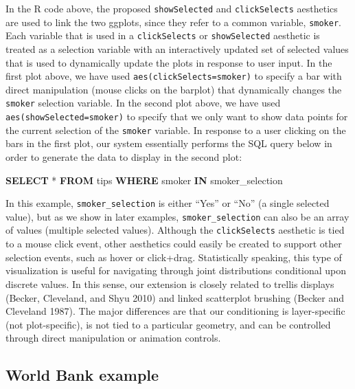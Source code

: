 \documentclass[12pt,]{article}
\newenvironment{Shaded}{\begin{snugshade}}{\end{snugshade}}
\newcommand{\KeywordTok}[1]{\textcolor[rgb]{0.13,0.29,0.53}{\textbf{#1}}}
\newcommand{\NormalTok}[1]{#1}
\theoremstyle{definition}
\theoremstyle{definition}
\theoremstyle{definition}
\theoremstyle{remark}
\begin{document}
In the R code above, the proposed \texttt{showSelected} and
\texttt{clickSelects} aesthetics are used to link the two ggplots, since
they refer to a common variable, \texttt{smoker}. Each variable that is
used in a \texttt{clickSelects} or \texttt{showSelected} aesthetic is
treated as a selection variable with an interactively updated set of
selected values that is used to dynamically update the plots in response
to user input. In the first plot above, we have used
\texttt{aes(clickSelects=smoker)} to specify a bar with direct
manipulation (mouse clicks on the barplot) that dynamically changes the
\texttt{smoker} selection variable. In the second plot above, we have
used \texttt{aes(showSelected=smoker)} to specify that we only want to
show data points for the current selection of the \texttt{smoker}
variable. In response to a user clicking on the bars in the first plot,
our system essentially performs the SQL query below in order to generate
the data to display in the second plot:

\begin{Shaded}
\begin{Highlighting}[]
\KeywordTok{SELECT}\NormalTok{ * }\KeywordTok{FROM}\NormalTok{ tips}
  \KeywordTok{WHERE}\NormalTok{ smoker }\KeywordTok{IN}\NormalTok{ smoker_selection}
\end{Highlighting}
\end{Shaded}

In this example, \texttt{smoker\_selection} is either ``Yes'' or ``No''
(a single selected value), but as we show in later examples,
\texttt{smoker\_selection} can also be an array of values (multiple
selected values). Although the \texttt{clickSelects} aesthetic is tied
to a mouse click event, other aesthetics could easily be created to
support other selection events, such as hover or click+drag.
Statistically speaking, this type of visualization is useful for
navigating through joint distributions conditional upon discrete values.
In this sense, our extension is closely related to trellis displays
(Becker, Cleveland, and Shyu 2010) and linked scatterplot brushing
(Becker and Cleveland 1987). The major differences are that our
conditioning is layer-specific (not plot-specific), is not tied to a
particular geometry, and can be controlled through direct manipulation
or animation controls.

\hypertarget{worldbank}{%
\subsection{World Bank example}\label{worldbank}}
\end{document}
